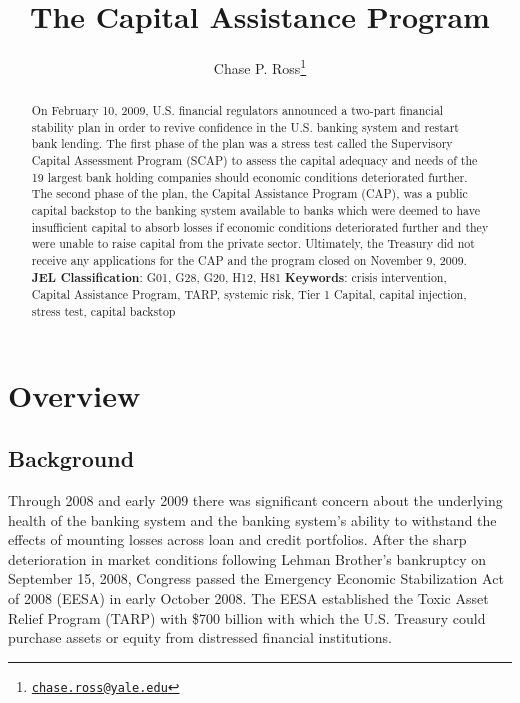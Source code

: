 \documentclass[12pt]{article}
\begin{document}
	\lhead{}
	\rhead{}
	\renewcommand{\headrulewidth}{0.0pt}
	\renewcommand{\footrulewidth}{0.0pt}

\title{The Capital Assistance Program}
\author{Chase P. Ross\thanks{\texttt{\href{mailto:chase.ross@yale.edu}{chase.ross@yale.edu}}}}

\maketitle

\begin{abstract}
On February 10, 2009, U.S. financial regulators announced a two-part financial stability plan in order to revive confidence in the U.S. banking system and restart bank lending. The first phase of the plan was a stress test called the Supervisory Capital Assessment Program (SCAP) to assess the capital adequacy and needs of the 19 largest bank holding companies should economic conditions deteriorated further. The second phase of the plan, the Capital Assistance Program (CAP), was a public capital backstop to the banking system available to banks which were deemed to have insufficient capital to absorb losses if economic conditions deteriorated further and they were unable to raise capital from the private sector. Ultimately, the Treasury did not receive any applications for the CAP and the program closed on November 9, 2009.
\newline
\newline
\textbf{JEL Classification}: G01, G28, G20, H12, H81
\newline
\newline
\textbf{Keywords}: crisis intervention, Capital Assistance Program, TARP, systemic risk, Tier 1 Capital, capital injection, stress test, capital backstop

\end{abstract}
\newpage
\tableofcontents

\newpage
\linenumbers
\section{Overview}

\subsection{Background}

Through 2008 and early 2009 there was significant concern about the underlying health of the banking system and the banking system's ability to withstand the effects of mounting losses across loan and credit portfolios. After the sharp deterioration in market conditions following Lehman Brother's bankruptcy on September 15, 2008, Congress passed the Emergency Economic Stabilization Act of 2008 (EESA) in early October 2008. The EESA established the Toxic Asset Relief Program (TARP) with \$700 billion with which the U.S. Treasury could purchase assets or equity from distressed financial institutions.
\end{document}
